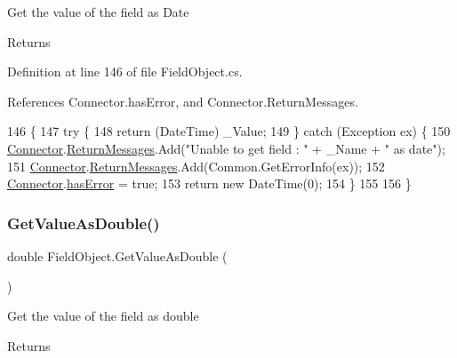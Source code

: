 Get the value of the field as Date 

\begin{DoxyReturn}{Returns}

\end{DoxyReturn}


Definition at line 146 of file Field\+Object.\+cs.



References Connector.\+has\+Error, and Connector.\+Return\+Messages.


\begin{DoxyCode}
146                                      \{
147         \textcolor{keywordflow}{try} \{
148             \textcolor{keywordflow}{return} (DateTime) \_Value;
149         \} \textcolor{keywordflow}{catch} (Exception ex) \{
150             \mbox{\hyperlink{class_connector}{Connector}}.\mbox{\hyperlink{class_connector_a1ed422674b344524fd77998dcf6a9ba6}{ReturnMessages}}.Add(\textcolor{stringliteral}{"Unable to get field : "} + \_Name + \textcolor{stringliteral}{" as
       date"});
151             \mbox{\hyperlink{class_connector}{Connector}}.\mbox{\hyperlink{class_connector_a1ed422674b344524fd77998dcf6a9ba6}{ReturnMessages}}.Add(Common.GetErrorInfo(ex));
152             \mbox{\hyperlink{class_connector}{Connector}}.\mbox{\hyperlink{class_connector_a079bae21a5417efa53bfe8954c0f533f}{hasError}} = \textcolor{keyword}{true};
153             \textcolor{keywordflow}{return} \textcolor{keyword}{new} DateTime(0);
154         \}
155        
156     \}
\end{DoxyCode}
\mbox{\label{class_field_object_aafe2b7d3e7d414345d85e19dddce3c47}} 
\subsubsection{\texorpdfstring{Get\+Value\+As\+Double()}{GetValueAsDouble()}}
{\footnotesize\ttfamily double Field\+Object.\+Get\+Value\+As\+Double (\begin{DoxyParamCaption}{ }\end{DoxyParamCaption})}



Get the value of the field as double 

\begin{DoxyReturn}{Returns}

\end{DoxyReturn}


